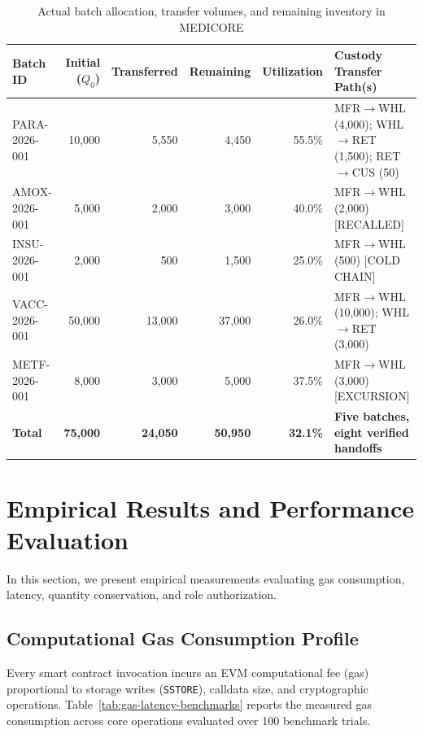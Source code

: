 \documentclass[pdflatex,sn-mathphys-num]{sn-jnl}
\theoremstyle{thmstyleone}
\theoremstyle{thmstyletwo}
\theoremstyle{thmstylethree}
\begin{document}
\begin{table}[htbp]
\centering
\caption{Actual batch allocation, transfer volumes, and remaining inventory in MEDICORE}
\label{tab:batch-data}
\vspace{0.5em}
\begin{tabularx}{\textwidth}{lrrrrX}
\toprule
\textbf{Batch ID} & \textbf{Initial ($Q_0$)} & \textbf{Transferred} & \textbf{Remaining} & \textbf{Utilization} & \textbf{Custody Transfer Path(s)} \\
\midrule
PARA-2026-001 & 10,000 & 5,550 & 4,450 & 55.5\% & MFR$\to$WHL (4,000); WHL$\to$RET (1,500); RET$\to$CUS (50) \\
AMOX-2026-001 & 5,000 & 2,000 & 3,000 & 40.0\% & MFR$\to$WHL (2,000) [RECALLED] \\
INSU-2026-001 & 2,000 & 500 & 1,500 & 25.0\% & MFR$\to$WHL (500) [COLD CHAIN] \\
VACC-2026-001 & 50,000 & 13,000 & 37,000 & 26.0\% & MFR$\to$WHL (10,000); WHL$\to$RET (3,000) \\
METF-2026-001 & 8,000 & 3,000 & 5,000 & 37.5\% & MFR$\to$WHL (3,000) [EXCURSION] \\
\midrule
\textbf{Total} & \textbf{75,000} & \textbf{24,050} & \textbf{50,950} & \textbf{32.1\%} & \textbf{Five batches, eight verified handoffs} \\
\bottomrule
\end{tabularx}
\end{table}


\section{Empirical Results and Performance Evaluation}\label{sec:results}

In this section, we present empirical measurements evaluating gas consumption, latency, quantity conservation, and role authorization.

\subsection{Computational Gas Consumption Profile}

Every smart contract invocation incurs an EVM computational fee (gas) proportional to storage writes (\texttt{SSTORE}), calldata size, and cryptographic operations. Table~\ref{tab:gas-latency-benchmarks} reports the measured gas consumption across core operations evaluated over 100 benchmark trials.
\end{document}
